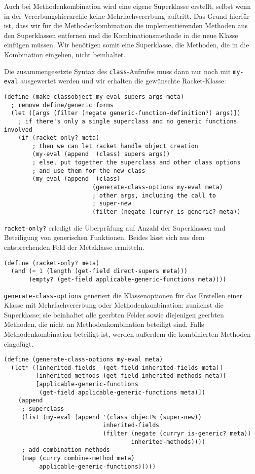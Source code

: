 Auch bei Methodenkombination wird eine eigene Superklasse erstellt, selbst wenn in der Vererbungshierarchie keine Mehrfachvererbung auftritt. Das Grund hierfür ist, dass wir für die Methodenkombination die implementierenden Methoden aus den Superklassen entfernen und die Kombinationsmethode in die neue Klasse einfügen müssen. Wir benötigen somit eine Superklasse, die Methoden, die in die Kombination eingehen, nicht beinhaltet.

Die zusammengesetzte Syntax des \texttt{class}-Aufrufes muss dann nur noch mit \texttt{my-eval} ausgewertet werden und wir erhalten die gewünschte Racket-Klasse:

\begin{lstlisting}
(define (make-classobject my-eval supers args meta)
  ; remove define/generic forms
  (let ([args (filter (negate generic-function-definition?) args)])
    ; if there's only a single superclass and no generic functions involved
    (if (racket-only? meta)
        ; then we can let racket handle object creation
        (my-eval (append '(class) supers args))
        ; else, put together the superclass and other class options
        ; and use them for the new class
        (my-eval (append '(class)
                         (generate-class-options my-eval meta)
                         ; other args, including the call to
                         ; super-new
                         (filter (negate (curryr is-generic? meta)) 
\end{lstlisting}

\texttt{racket-only?} erledigt die Überprüfung auf Anzahl der Superklassen und Beteiligung von generischen Funktionen. Beides lässt sich aus dem entsprechenden Feld der Metaklasse ermitteln. 

\begin{lstlisting}
(define (racket-only? meta)
  (and (= 1 (length (get-field direct-supers meta)))
       (empty? (get-field applicable-generic-functions meta))))
\end{lstlisting}

\texttt{generate-class-options} generiert die Klassenoptionen für das Erstellen einer Klasse mit Mehrfachvererbung oder Methodenkombination: zunächst die Superklasse; sie beinhaltet alle geerbten Felder sowie diejenigen geerbten Methoden, die nicht an Methodenkombination beteiligt sind. Falls Methodenkombination beteiligt ist, werden außerdem die kombinierten Methoden eingefügt.

\begin{lstlisting}
(define (generate-class-options my-eval meta)
  (let* ([inherited-fields  (get-field inherited-fields meta)]
         [inherited-methods (get-field inherited-methods meta)]
         [applicable-generic-functions 
          (get-field applicable-generic-functions meta)])
    (append
     ; superclass
     (list (my-eval (append '(class object% (super-new))
                            inherited-fields
                            (filter (negate (curryr is-generic? meta))
                                    inherited-methods))))
     ; add combination methods
     (map (curry combine-method meta)
          applicable-generic-functions)))))
\end{lstlisting}

